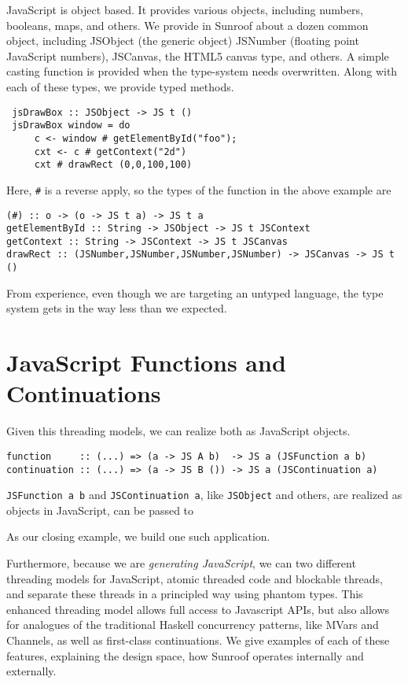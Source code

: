 \documentclass{llncs}
\begin{document}
JavaScript is object based. It provides various objects,
including numbers, booleans, maps, and others. We
provide in Sunroof about a dozen common object,
including JSObject (the generic object) JSNumber
(floating point JavaScript numbers), JSCanvas,
the HTML5 canvas type, and others. A simple
casting function is provided when the type-system
needs overwritten.  Along with each of these types,
we provide typed methods.

\begin{verbatim}
 jsDrawBox :: JSObject -> JS t ()
 jsDrawBox window = do
     c <- window # getElementById("foo");
     cxt <- c # getContext("2d")
     cxt # drawRect (0,0,100,100)
\end{verbatim}

Here, \verb|#| is a reverse apply, so the types
of the function in the above example are
\begin{verbatim}
(#) :: o -> (o -> JS t a) -> JS t a
getElementById :: String -> JSObject -> JS t JSContext
getContext :: String -> JSContext -> JS t JSCanvas
drawRect :: (JSNumber,JSNumber,JSNumber,JSNumber) -> JSCanvas -> JS t ()
\end{verbatim}        

From experience, even though we are targeting
an untyped language, the type system gets in the
way less than we expected.

\section{JavaScript Functions and Continuations}

Given this threading models, we can realize both as 
JavaScript objects. 
\begin{verbatim}
function     :: (...) => (a -> JS A b)  -> JS a (JSFunction a b)
continuation :: (...) => (a -> JS B ()) -> JS a (JSContinuation a)
\end{verbatim}

\verb|JSFunction a b| and \verb|JSContinuation a|,
like \verb|JSObject| and others, are realized as objects
in JavaScript, can be passed to 

 As our closing example, we build one such application.

Furthermore,
because we are {\em generating JavaScript}, we can two different
threading models for JavaScript, atomic threaded code and blockable threads,
and separate these threads in a principled way using phantom types.
This enhanced threading model allows full access to Javascript APIs,
but also allows for analogues of the traditional
Haskell concurrency patterns, like MVars and Channels,
as well as first-class continuations.
We give examples of each of these features, explaining the
design space, how Sunroof operates internally and externally.
\end{document}
